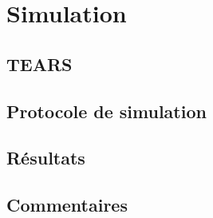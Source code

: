 \section{Simulation}
\label{sec:contribution_tf-ordo_simulation}

\subsection{TEARS}
\subsection{Protocole de simulation}
\subsection{Résultats}
\subsection{Commentaires}


